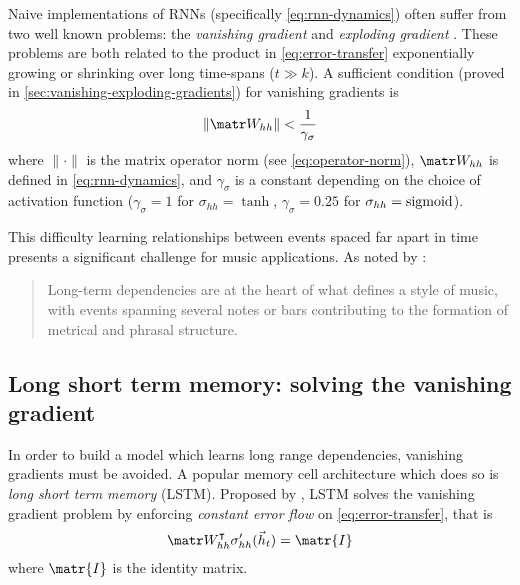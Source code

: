 Naive implementations of RNNs (specifically \cref{eq:rnn-dynamics}) often
suffer from two well known problems: the \emph{vanishing gradient} and
\emph{exploding gradient} \citep{Bengio1994}. These problems are both related
to the product in \cref{eq:error-transfer} exponentially growing or shrinking
over long time-spans (\ie $t \gg k$). A sufficient condition (proved in
\vref{sec:vanishing-exploding-gradients}) for vanishing gradients is
\begin{equation}\label{eq:vanishing-gradients-suff}
  \left\| \W_{hh} \right\| < \frac{1}{\gamma_\sigma}
\end{equation}
where $\| \cdot \|$ is the matrix operator norm (see \vref{eq:operator-norm}),
$\W_{hh}$ is defined in \vref{eq:rnn-dynamics},
and $\gamma_\sigma$ is a constant depending on the choice of activation function
(\eg $\gamma_\sigma = 1$ for $\sigma_{hh} = \tanh$, $\gamma_\sigma = 0.25$ for
$\sigma_{hh} = \operatorname*{sigmoid}$).

This difficulty learning relationships between events spaced far apart in time
presents a significant challenge for music applications. As noted by
\citet{cooper1963rhythmic}:
\begin{quote}
  Long-term dependencies are at the heart of what defines a style of music, with
  events spanning several notes or bars contributing to the formation of metrical and phrasal
  structure.
\end{quote}

\subsection{Long short term memory: solving the vanishing gradient}\label{sec:LSTM}


In order to build a model which learns long range dependencies, vanishing
gradients must be avoided. A popular memory cell architecture which does so is
\emph{long short term memory} (LSTM). Proposed by \citet{hochreiter1997long},
LSTM solves the vanishing gradient problem by enforcing \emph{constant error
flow} on \cref{eq:error-transfer}, that is
\begin{equation}\label{eq:const-err-flow}
    \W_{hh}^\tp \sigma_{hh}' (\h_{t}) = \matr{I}
\end{equation}
where $\matr{I}$ is the identity matrix.

